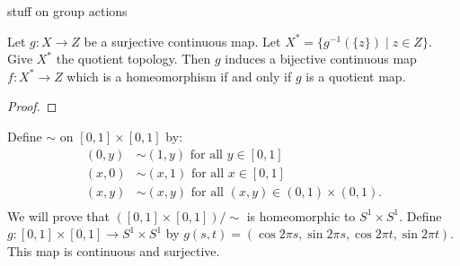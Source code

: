 {\color{red} stuff on group actions}

\begin{corollary}
    Let $g:X \rightarrow Z$ be a surjective continuous map. Let $X^\ast = \{g^{-1}(\{z\}) \mid z \in Z\}$. Give $X^\ast$ the quotient topology. Then $g$ induces a bijective continuous map $f:X^\ast \rightarrow Z$ which is a homeomorphism if and only if $g$ is a quotient map.
\end{corollary}
    {\color{red} \begin{proof}
        
    \end{proof}}

\begin{example}
    Define $\sim$ on $[0,1] \times [0,1]$ by:
        \begin{equation*}
        \begin{split}
            (0,y) &\sim (1,y) \text{ for all }y \in [0,1]\\
            (x,0) &\sim (x,1) \text{ for all }x \in [0,1]\\
            (x,y) &\sim (x,y) \text{ for all }(x,y) \in (0,1) \times (0,1).\\
        \end{split}
        \end{equation*}
    We will prove that $([0,1] \times [0,1])/\sim$ is homeomorphic to $S^1 \times S^1$. Define $g:[0,1] \times [0,1] \rightarrow S^1 \times S^1$ by $g(s,t) = (\cos 2\pi s, \sin 2\pi s, \cos 2 \pi t, \sin 2 \pi t)$. This map is continuous and surjective.
\end{example}
